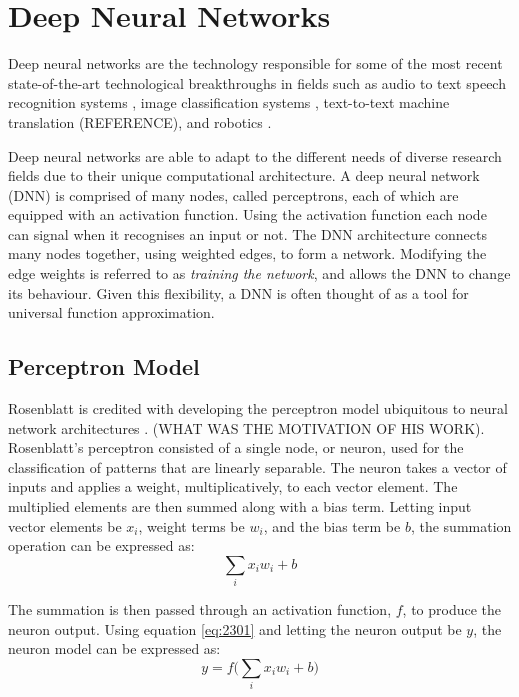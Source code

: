 \section{Deep Neural Networks}\label{dnn}
Deep neural networks are the technology responsible for some of the most recent state-of-the-art technological breakthroughs in fields such as audio to text speech recognition systems \cite{Hinton2012}, image classification systems \cite{Krizhevsky2012, Simonyan2014, Szegedy2015, He2016}, text-to-text machine translation (REFERENCE), and robotics \cite{Mnih2015, Lillicrap2015, Schulman2015, Schulman2015highdimensional}.

Deep neural networks are able to adapt to the different needs of diverse research fields due to their unique computational architecture. A deep neural network (DNN) is comprised of many nodes, called perceptrons, each of which are equipped with an activation function. Using the activation function each node can signal when it recognises an input or not. The DNN architecture connects many nodes together, using weighted edges, to form a network. Modifying the edge weights is referred to as \textit{training the network}, and allows the DNN to change its behaviour. Given this flexibility, a DNN is often thought of as a tool for universal function approximation.


\subsection{Perceptron Model}
Rosenblatt is credited with developing the perceptron model ubiquitous to neural network architectures \cite{Rosenblatt1958}. (WHAT WAS THE MOTIVATION OF HIS WORK). Rosenblatt's perceptron consisted of a single node, or neuron, used for the classification of patterns that are linearly separable. The neuron takes a vector of inputs and applies a weight, multiplicatively, to each vector element. The multiplied elements are then summed along with a bias term. Letting input vector elements be $x_i$, weight terms be $w_i$, and the bias term be $b$, the summation operation can be expressed as:
\begin{equation}
	\sum_{i}x_i w_i + b \label{eq:2301}
\end{equation} 

The summation is then passed through an activation function, $f$, to produce the neuron output. Using equation \ref{eq:2301} and letting the neuron output be $y$, the neuron model can be expressed as:
\begin{equation}
	y = f\bigg( \sum_{i}x_i w_i + b \bigg) \label{eq:2302}
\end{equation}

